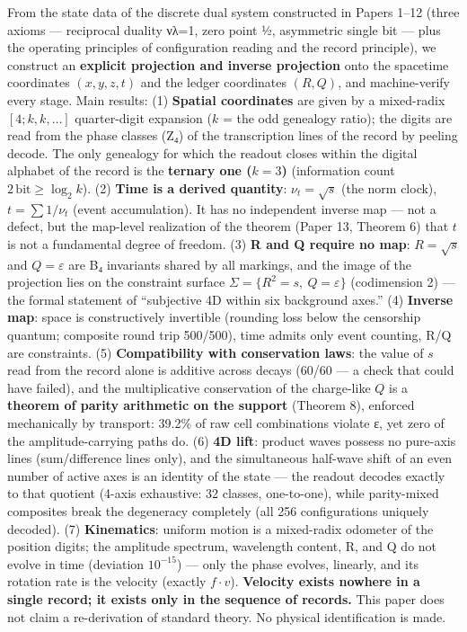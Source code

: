 \documentclass[
]{article}
\begin{document}
From the state data of the discrete dual system constructed in Papers
1--12 (three axioms --- reciprocal duality νλ=1, zero point ½,
asymmetric single bit --- plus the operating principles of configuration
reading and the record principle), we construct an \textbf{explicit
projection and inverse projection} onto the spacetime coordinates
\((x,y,z,t)\) and the ledger coordinates \((R,Q)\), and machine-verify
every stage. Main results: (1) \textbf{Spatial coordinates} are given by
a mixed-radix \([4;k,k,\dots]\) quarter-digit expansion (\(k\) = the odd
genealogy ratio); the digits are read from the phase classes (Z₄) of the
transcription lines of the record by peeling decode. The only genealogy
for which the readout closes within the digital alphabet of the record
is the \textbf{ternary one (\(k{=}3\))} (information count
\(2\,\mathrm{bit}\ge\log_2 k\)). (2) \textbf{Time is a derived
quantity}: \(\nu_t=\sqrt{s}\) (the norm clock), \(t=\sum 1/\nu_t\)
(event accumulation). It has no independent inverse map --- not a
defect, but the map-level realization of the theorem (Paper 13, Theorem
6) that \(t\) is not a fundamental degree of freedom. (3) \textbf{R and
Q require no map}: \(R=\sqrt{s}\) and \(Q=\varepsilon\) are B₄
invariants shared by all markings, and the image of the projection lies
on the constraint surface \(\Sigma=\{R^2=s,\ Q=\varepsilon\}\)
(codimension 2) --- the formal statement of ``subjective 4D within six
background axes.'' (4) \textbf{Inverse map}: space is constructively
invertible (rounding loss below the censorship quantum; composite round
trip 500/500), time admits only event counting, R/Q are constraints. (5)
\textbf{Compatibility with conservation laws}: the value of \(s\) read
from the record alone is additive across decays (60/60 --- a check that
could have failed), and the multiplicative conservation of the
charge-like \(Q\) is a \textbf{theorem of parity arithmetic on the
support} (Theorem 8), enforced mechanically by transport: 39.2\% of raw
cell combinations violate ε, yet zero of the amplitude-carrying paths
do. (6) \textbf{4D lift}: product waves possess no pure-axis lines
(sum/difference lines only), and the simultaneous half-wave shift of an
even number of active axes is an identity of the state --- the readout
decodes exactly to that quotient (4-axis exhaustive: 32 classes,
one-to-one), while parity-mixed composites break the degeneracy
completely (all 256 configurations uniquely decoded). (7)
\textbf{Kinematics}: uniform motion is a mixed-radix odometer of the
position digits; the amplitude spectrum, wavelength content, R, and Q do
not evolve in time (deviation \(10^{-15}\)) --- only the phase evolves,
linearly, and its rotation rate is the velocity (exactly \(f\cdot v\)).
\textbf{Velocity exists nowhere in a single record; it exists only in
the sequence of records.} This paper does not claim a re-derivation of
standard theory. No physical identification is made.
\end{document}
